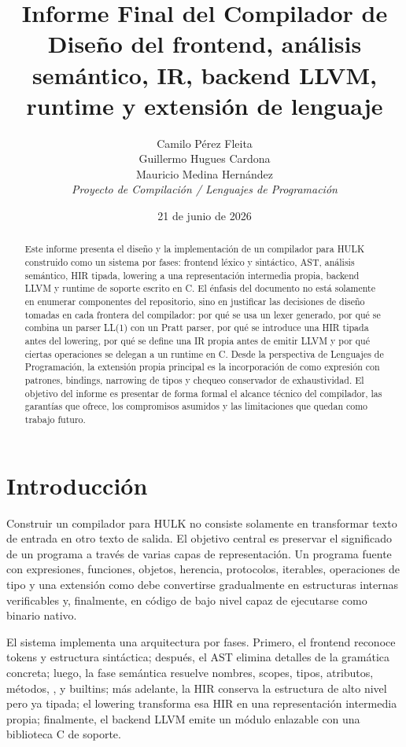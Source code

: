 \documentclass[12pt,letterpaper]{article}
\title{Informe Final del Compilador de \hulk\\
\large Diseño del frontend, análisis semántico, IR, backend LLVM, runtime y extensión de lenguaje}
\author{
Camilo Pérez Fleita\\
Guillermo Hugues Cardona\\
Mauricio Medina Hernández\\[0.5em]
\textit{Proyecto de Compilación / Lenguajes de Programación}
}
\date{21 de junio de 2026}
\newcommand{\repo}[1]{\texttt{\detokenize{#1}}}
\newcommand{\hulk}{\textsc{HULK}}
\begin{document}
\maketitle

\begin{abstract}
Este informe presenta el diseño y la implementación de un compilador para \hulk{} construido como un sistema por fases: frontend léxico y sintáctico, AST, análisis semántico, HIR tipada, lowering a una representación intermedia propia, backend LLVM y runtime de soporte escrito en C. El énfasis del documento no está solamente en enumerar componentes del repositorio, sino en justificar las decisiones de diseño tomadas en cada frontera del compilador: por qué se usa un lexer generado, por qué se combina un parser LL(1) con un Pratt parser, por qué se introduce una HIR tipada antes del lowering, por qué se define una IR propia antes de emitir LLVM y por qué ciertas operaciones se delegan a un runtime en C. Desde la perspectiva de Lenguajes de Programación, la extensión propia principal es la incorporación de \repo{match} como expresión con patrones, bindings, narrowing de tipos y chequeo conservador de exhaustividad. El objetivo del informe es presentar de forma formal el alcance técnico del compilador, las garantías que ofrece, los compromisos asumidos y las limitaciones que quedan como trabajo futuro.
\end{abstract}

\tableofcontents
\newpage

\section{Introducción}

Construir un compilador para \hulk{} no consiste solamente en transformar texto de entrada en otro texto de salida. El objetivo central es preservar el significado de un programa a través de varias capas de representación. Un programa fuente con expresiones, funciones, objetos, herencia, protocolos, iterables, operaciones de tipo y una extensión como \repo{match} debe convertirse gradualmente en estructuras internas verificables y, finalmente, en código de bajo nivel capaz de ejecutarse como binario nativo.

El sistema implementa una arquitectura por fases. Primero, el frontend reconoce tokens y estructura sintáctica; después, el AST elimina detalles de la gramática concreta; luego, la fase semántica resuelve nombres, scopes, tipos, atributos, métodos, \repo{self}, \repo{base} y builtins; más adelante, la HIR conserva la estructura de alto nivel pero ya tipada; el lowering transforma esa HIR en una representación intermedia propia; finalmente, el backend LLVM emite un módulo enlazable con una biblioteca C de soporte.
\end{document}
